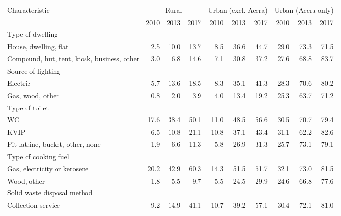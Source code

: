 \begin{tabular}{l r r r r r r r r r}
\toprule
Characteristic & \multicolumn{3}{c}{Rural} & \multicolumn{3}{c}{Urban (excl. Accra)} & \multicolumn{3}{c}{Urban (Accra only)} \\
\cmidrule(lr){2-4}
\cmidrule(lr){5-7}
\cmidrule(lr){8-10}
& 2010 & 2013 & 2017 & 2010 & 2013 & 2017 & 2010 & 2013 & 2017 \\
\midrule
Type of dwelling &&&&&&&&&\\
\hspace{6mm} House, dwelling, flat  &  2.5  &  10.0  &  13.7  &  8.5  &  36.6  &  44.7  &  29.0  &  73.3  &  71.5 \\
\hspace{6mm} Compound, hut, tent, kiosk, business, other  &  3.0  &  6.8  &  14.6  &  7.1  &  30.8  &  37.2  &  27.6  &  68.8  &  83.7 \\
Source of lighting &&&&&&&&&\\
\hspace{6mm} Electric  &  5.7  &  13.6  &  18.5  &  8.3  &  35.1  &  41.3  &  28.3  &  70.6  &  80.2 \\
\hspace{6mm} Gas, wood, other  &  0.8  &  2.0  &  3.9  &  4.0  &  13.4  &  19.2  &  25.3  &  63.7  &  71.2 \\
Type of toilet &&&&&&&&&\\
\hspace{6mm} WC  &  17.6  &  38.4  &  50.1  &  11.0  &  48.5  &  56.6  &  30.5  &  70.7  &  79.4 \\
\hspace{6mm} KVIP  &  6.5  &  10.8  &  21.1  &  10.8  &  37.1  &  43.4  &  31.1  &  62.2  &  82.6 \\
\hspace{6mm} Pit latrine, bucket, other, none  &  1.9  &  6.6  &  11.3  &  5.8  &  26.9  &  31.3  &  25.7  &  73.1  &  79.1 \\
Type of cooking fuel &&&&&&&&&\\
\hspace{6mm} Gas, electricity or kerosene  &  20.2  &  42.9  &  60.3  &  14.3  &  51.5  &  61.7  &  32.1  &  73.0  &  81.5 \\
\hspace{6mm} Wood, other  &  1.8  &  5.5  &  9.7  &  5.5  &  24.5  &  29.9  &  24.6  &  66.8  &  77.6 \\
Solid waste disposal method &&&&&&&&&\\
\hspace{6mm} Collection service  &  9.2  &  14.9  &  41.1  &  10.7  &  39.2  &  57.1  &  30.4  &  72.1  &  81.0 \\

\end{tabular}
